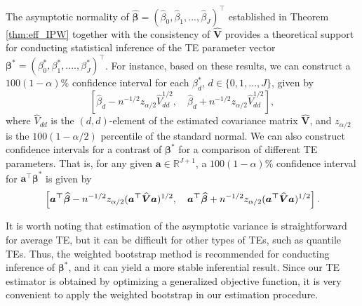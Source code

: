 \documentclass[11pt]{article}
\numberwithin{equation}{section}
\begin{document}
The asymptotic normality of $\widehat{\boldsymbol{\beta }}=(%
\widehat{\beta }_{0},\widehat{\beta }_{1},...,\widehat{\beta }_{J})^{\top }$
established in Theorem \ref{thm:eff_IPW} together with the consistency of $%
\widehat{\boldsymbol{V}}$ provides a theoretical support for conducting
statistical inference of the TE parameter vector $\boldsymbol{\beta }^{\ast
}=(\beta _{0}^{\ast },\beta _{1}^{\ast },....,\beta _{J}^{\ast })^{\top }$.
For instance, based on these results, we can construct a $100(1-\alpha )\%$
confidence interval for each ${\beta }_{d}^{\ast}$, $d\in\{0,1,...,J\}$,
given by
\begin{equation*}
	\left[ \widehat{\beta }_{d}-n^{-1/2}z_{\alpha /2}\widehat{V}%
	_{dd}^{1/2},\quad \widehat{\beta}_{d}+n^{-1/2}z_{\alpha /2}\widehat{V}_{dd}^{1/2}%
	\right] ,
\end{equation*}%
where $\widehat{V}_{dd}$ is the $(d,d)$-element of the estimated covariance
matrix $\widehat{\boldsymbol{V}}$, and $z_{\alpha /2}$ is the $100(1-\alpha
/2)$ percentile of the standard normal. We can also construct confidence
intervals for a contrast of {$\boldsymbol{\beta }^{\ast }$ for a comparison
	of different TE parameters. That is, }for any given {$\boldsymbol{a}$}$\in
\mathbb{R}^{J+1}$, a $100(1-\alpha )\%$ confidence interval for $%
\boldsymbol{a^{\top }\beta }^{\ast }$ is given by
\begin{equation*}
	\left[ {\boldsymbol{a^{\top }}}\widehat{\boldsymbol{\beta }}%
	-n^{-1/2}z_{\alpha /2}({\boldsymbol{a^{\top }}\widehat{\boldsymbol{V}}%
		\boldsymbol{a}})^{1/2},\quad {\boldsymbol{a^{\top }}}\widehat{\boldsymbol{%
			\beta }}+n^{-1/2}z_{\alpha /2}({\boldsymbol{a^{\top }}\widehat{\boldsymbol{V}%
		}\boldsymbol{a}})^{1/2}\right] .
\end{equation*}

It is worth noting that estimation of the asymptotic variance is straightforward for average TE, but it can be difficult for other types of TEs, such as quantile TEs. Thus, the weighted bootstrap method is recommended for conducting inference of $\boldsymbol{\beta }^{\ast }$, and it can yield a more stable inferential result. Since our TE estimator is
obtained by optimizing a generalized objective function, it is very convenient to apply the weighted bootstrap in our estimation procedure.
\end{document}
